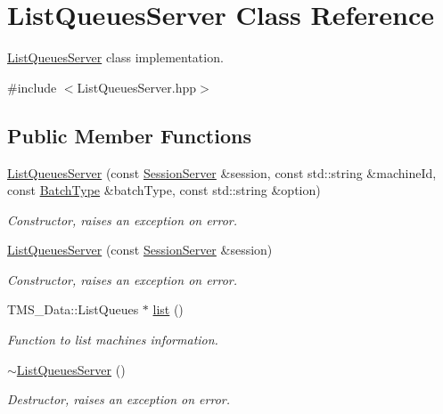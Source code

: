 \hypertarget{classListQueuesServer}{
\section{ListQueuesServer Class Reference}
\label{classListQueuesServer}
}


\hyperlink{classListQueuesServer}{ListQueuesServer} class implementation.  




{\ttfamily \#include $<$ListQueuesServer.hpp$>$}

\subsection*{Public Member Functions}
\begin{DoxyCompactItemize}
\item 
\hyperlink{classListQueuesServer_a6d4d04d78890a204b0cf04e3e9050e20}{ListQueuesServer} (const \hyperlink{classSessionServer}{SessionServer} \&session, const std::string \&machineId, const \hyperlink{utilVishnu_8hpp_a864d748e7097d176552dd4c7635016ea}{BatchType} \&batchType, const std::string \&option)
\begin{DoxyCompactList}\small\item\em Constructor, raises an exception on error. \item\end{DoxyCompactList}\item 
\hyperlink{classListQueuesServer_ae5b2ded488fba8e7d7058ffb8cb9a59f}{ListQueuesServer} (const \hyperlink{classSessionServer}{SessionServer} \&session)
\begin{DoxyCompactList}\small\item\em Constructor, raises an exception on error. \item\end{DoxyCompactList}\item 
TMS\_\-Data::ListQueues $\ast$ \hyperlink{classListQueuesServer_ad8d802cb277d6bea8ca93340e4841444}{list} ()
\begin{DoxyCompactList}\small\item\em Function to list machines information. \item\end{DoxyCompactList}\item 
\hypertarget{classListQueuesServer_a8fa3170eef996df2357476355c2d2c52}{
\hyperlink{classListQueuesServer_a8fa3170eef996df2357476355c2d2c52}{$\sim$ListQueuesServer} ()}
\label{classListQueuesServer_a8fa3170eef996df2357476355c2d2c52}

\begin{DoxyCompactList}\small\item\em Destructor, raises an exception on error. \item\end{DoxyCompactList}\end{DoxyCompactItemize}
